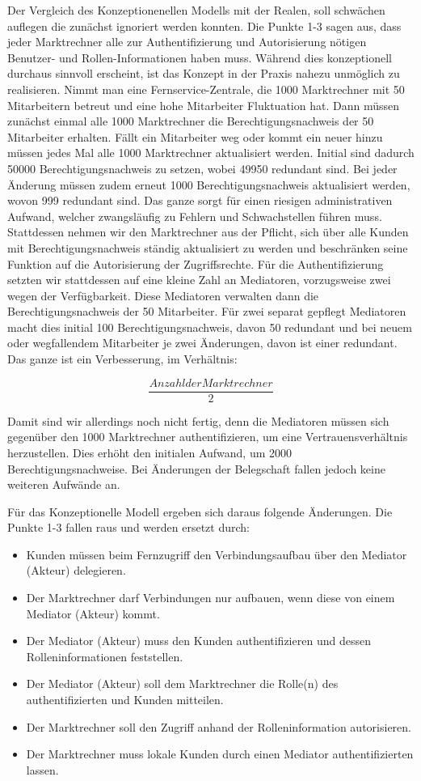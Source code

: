 \documentclass[11pt,a4paper]{report}
\begin{document}
Der Vergleich des Konzeptionenellen Modells mit der Realen, soll schwächen auflegen die zunächst ignoriert werden konnten. Die Punkte 1-3 sagen aus, dass jeder Marktrechner alle zur Authentifizierung und Autorisierung nötigen Benutzer- und Rollen-Informationen haben muss. Während dies konzeptionell durchaus sinnvoll erscheint, ist das Konzept in der Praxis nahezu unmöglich zu realisieren. Nimmt man eine Fernservice-Zentrale, die 1000 Marktrechner mit 50 Mitarbeitern betreut und eine hohe Mitarbeiter Fluktuation hat. Dann müssen zunächst einmal alle 1000 Marktrechner die Berechtigungsnachweis der 50 Mitarbeiter erhalten. Fällt ein Mitarbeiter weg oder kommt ein neuer hinzu müssen jedes Mal alle 1000 Marktrechner aktualisiert werden. Initial sind dadurch 50000 Berechtigungsnachweis zu setzen, wobei 49950 redundant sind. Bei jeder Änderung müssen zudem erneut 1000 Berechtigungsnachweis aktualisiert werden, wovon 999 redundant sind. Das ganze sorgt für einen riesigen administrativen Aufwand, welcher zwangsläufig zu Fehlern und Schwachstellen führen muss. Stattdessen nehmen wir den Marktrechner aus der Pflicht, sich über alle Kunden mit Berechtigungsnachweis ständig aktualisiert zu werden und beschränken seine Funktion auf die Autorisierung der Zugriffsrechte. Für die Authentifizierung setzten wir stattdessen auf eine kleine Zahl an Mediatoren, vorzugsweise zwei wegen der Verfügbarkeit. Diese Mediatoren verwalten dann die Berechtigungsnachweis der 50 Mitarbeiter. Für zwei separat gepflegt Mediatoren macht dies initial 100 Berechtigungsnachweis, davon 50 redundant und bei neuem oder wegfallendem Mitarbeiter je zwei Änderungen, davon ist einer redundant. Das ganze ist ein Verbesserung, im Verhältnis:

\[\frac{Anzahl der Marktrechner}{2}\]
 
Damit sind wir allerdings noch nicht fertig, denn die Mediatoren müssen sich gegenüber den 1000 Marktrechner authentifizieren, um eine Vertrauensverhältnis herzustellen. Dies erhöht den initialen Aufwand, um 2000 Berechtigungsnachweise. Bei Änderungen der Belegschaft fallen jedoch keine weiteren Aufwände an.

Für das Konzeptionelle Modell ergeben sich daraus folgende Änderungen. Die Punkte 1-3 fallen raus und werden ersetzt durch:

\begin{itemize}[leftmargin=*]
\item Kunden müssen beim Fernzugriff den Verbindungsaufbau über den Mediator (Akteur) delegieren.
\item Der Marktrechner darf Verbindungen nur aufbauen, wenn diese von einem Mediator (Akteur) kommt.
\item Der Mediator (Akteur) muss den Kunden authentifizieren und dessen Rolleninformationen feststellen.
\item Der Mediator (Akteur) soll dem Marktrechner die Rolle(n) des authentifizierten und Kunden mitteilen.
\item Der Marktrechner soll den Zugriff anhand der Rolleninformation autorisieren.
\item Der Marktrechner muss lokale Kunden durch einen Mediator authentifizierten lassen.
\end{itemize}
\end{document}
